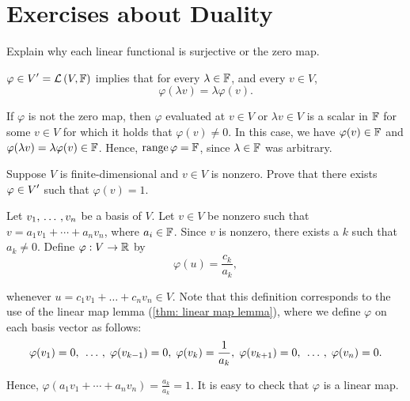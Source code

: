 \section*{Exercises about Duality}


\begin{xrcs}
  Explain why each linear functional is surjective or the zero map.

  \begin{xsol}
    $\varphi \in \displaystyle V' = {\mathcal{L}\left (V, \mathbb{F}\right )}$ implies that for every $\lambda \in \mathbb{F}$, and every $v \in V$,
    \begin{equation}
      \varphi (\lambda v) = \lambda \varphi(v).
    \end{equation}

    If $\varphi$ is not the zero map, then $\varphi$ evaluated at $v \in V$ or $\lambda v \in V$ is a scalar in  $\mathbb{F}$ for some $v \in V$ for which it holds that $\varphi(v) \neq 0$. In this case, we have $\varphi(v) \in \mathbb{F}$ and $ \varphi(\lambda v) = \lambda \varphi(v) \in \mathbb{F}$. Hence, $\operatorname{range} \varphi = \mathbb{F}$, since $\lambda  \in \mathbb{F}$ was arbitrary.
  \end{xsol}
\end{xrcs}

\begin{xrcs}
  Suppose $V$ is finite-dimensional and $v \in V$ is nonzero. Prove that there exists $\varphi \in \displaystyle V'$ such that $\varphi(v) = 1$.

  \begin{xsol}
    Let $v_1, {\, \ldots \,\,}, v_n$ be a basis of $V$. Let $v \in V$ be nonzero such that $v = a_1 v_1 + \cdots + a_n v_n$, where $a_i \in \mathbb{F}$. Since $v$ is nonzero, there exists a $k$ such that $a_k \neq 0$. Define $\varphi: V \to \mathbb{R}$ by
    \begin{equation}
      \varphi (u) = \frac{c_k}{a_k},
    \end{equation}

    whenever $u = c_1 v_1 + \dots + c_n v_n \in V$. Note that this definition corresponds to the use of the linear map lemma (\ref{thm: linear map lemma}), where we define $\varphi$ on each basis vector as follows:
    \begin{equation}
      \varphi (v_1) = 0, \;  {\, \ldots \,\,}, \;
      \varphi(v_{k-1}) = 0, \;
      \varphi(v_k) = \frac{1}{a_k}, \;
      \varphi(v_{k+1}) = 0, \;  {\, \ldots \,\,}, \;
      \varphi(v_n) = 0.
    \end{equation}

    Hence, $\varphi(a_1 v_1 + \cdots + a_n v_n) = \frac{a_k}{a_k} = 1$. It is easy to check that $\varphi$ is a linear map.
  \end{xsol}
\end{xrcs}


